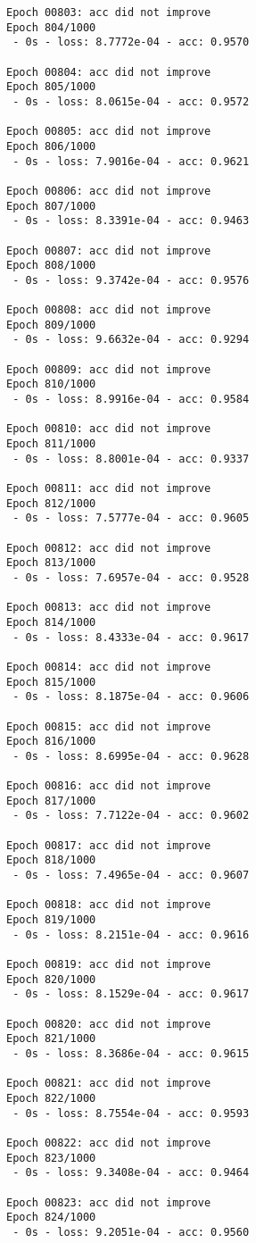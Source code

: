 \documentclass[11pt]{article}
\begin{document}
\begin{Verbatim}[commandchars=\\\{\}]
Epoch 00803: acc did not improve
Epoch 804/1000
 - 0s - loss: 8.7772e-04 - acc: 0.9570

Epoch 00804: acc did not improve
Epoch 805/1000
 - 0s - loss: 8.0615e-04 - acc: 0.9572

Epoch 00805: acc did not improve
Epoch 806/1000
 - 0s - loss: 7.9016e-04 - acc: 0.9621

Epoch 00806: acc did not improve
Epoch 807/1000
 - 0s - loss: 8.3391e-04 - acc: 0.9463

Epoch 00807: acc did not improve
Epoch 808/1000
 - 0s - loss: 9.3742e-04 - acc: 0.9576

Epoch 00808: acc did not improve
Epoch 809/1000
 - 0s - loss: 9.6632e-04 - acc: 0.9294

Epoch 00809: acc did not improve
Epoch 810/1000
 - 0s - loss: 8.9916e-04 - acc: 0.9584

Epoch 00810: acc did not improve
Epoch 811/1000
 - 0s - loss: 8.8001e-04 - acc: 0.9337

Epoch 00811: acc did not improve
Epoch 812/1000
 - 0s - loss: 7.5777e-04 - acc: 0.9605

Epoch 00812: acc did not improve
Epoch 813/1000
 - 0s - loss: 7.6957e-04 - acc: 0.9528

Epoch 00813: acc did not improve
Epoch 814/1000
 - 0s - loss: 8.4333e-04 - acc: 0.9617

Epoch 00814: acc did not improve
Epoch 815/1000
 - 0s - loss: 8.1875e-04 - acc: 0.9606

Epoch 00815: acc did not improve
Epoch 816/1000
 - 0s - loss: 8.6995e-04 - acc: 0.9628

Epoch 00816: acc did not improve
Epoch 817/1000
 - 0s - loss: 7.7122e-04 - acc: 0.9602

Epoch 00817: acc did not improve
Epoch 818/1000
 - 0s - loss: 7.4965e-04 - acc: 0.9607

Epoch 00818: acc did not improve
Epoch 819/1000
 - 0s - loss: 8.2151e-04 - acc: 0.9616

Epoch 00819: acc did not improve
Epoch 820/1000
 - 0s - loss: 8.1529e-04 - acc: 0.9617

Epoch 00820: acc did not improve
Epoch 821/1000
 - 0s - loss: 8.3686e-04 - acc: 0.9615

Epoch 00821: acc did not improve
Epoch 822/1000
 - 0s - loss: 8.7554e-04 - acc: 0.9593

Epoch 00822: acc did not improve
Epoch 823/1000
 - 0s - loss: 9.3408e-04 - acc: 0.9464

Epoch 00823: acc did not improve
Epoch 824/1000
 - 0s - loss: 9.2051e-04 - acc: 0.9560


\end{Verbatim}
\end{document}
